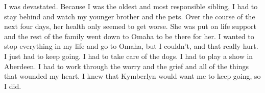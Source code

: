 \documentclass[12pt, letterpaper]{article}
\begin{document}
\begin{flushleft}
I was devastated.
Because I was the oldest and most responsible sibling,
I had to stay behind and watch my younger brother and the pets.
Over the course of the next four days,
her health only seemed to get worse.
She was put on life support and the rest of the family
went down to Omaha to be there for her.
I wanted to stop everything in my life and go to Omaha,
but I couldn't, and that really hurt.
I just had to keep going.
I had to take care of the dogs.
I had to play a show in Aberdeen.
I had to work through the worry and the grief and all of the things
that wounded my heart.
I knew that Kymberlyn would want me to keep going, so I did.
\vspace{5mm}









\end{flushleft}
\end{document}
